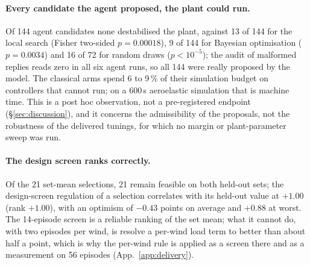 \documentclass{article}
\begin{document}
\paragraph{Every candidate the agent proposed, the plant could run.} Of 144 agent candidates none destabilised the plant, against 13 of 144 for the local search (Fisher two-sided $p = 0.00018$), 9 of 144 for Bayesian optimisation ($p = 0.0034$) and 16 of 72 for random draws ($p < 10^{-5}$); the audit of malformed replies reads zero in all six agent runs, so all 144 were really proposed by the model. The classical arms spend 6 to 9\,\% of their simulation budget on controllers that cannot run; on a 600\,s aeroelastic simulation that is machine time. This is a post hoc observation, not a pre-registered endpoint (§\ref{sec:discussion}), and it concerns the admissibility of the proposals, not the robustness of the delivered tunings, for which no margin or plant-parameter sweep was run.

\paragraph{The design screen ranks correctly.} Of the 21 set-mean selections, 21 remain feasible on both held-out sets; the design-screen regulation of a selection correlates with its held-out value at $+1.00$ (rank $+1.00$), with an optimism of $-0.43$ points on average and $+0.88$ at worst. The 14-episode screen is a reliable ranking of the set mean; what it cannot do, with two episodes per wind, is resolve a per-wind load term to better than about half a point, which is why the per-wind rule is applied as a screen there and as a measurement on 56 episodes (App.~\ref{app:delivery}).
\end{document}
